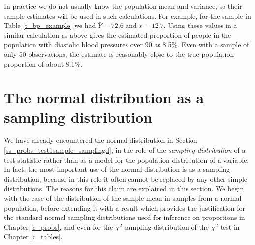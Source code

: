 In practice we do not usually know the population mean and variance, so
their sample estimates will be used in such calculations. For example,
for the sample in Table \ref{t_bp_example} we had $\bar{Y}=72.6$ and
$s=12.7$. Using these values in a similar calculation as above gives the
estimated proportion of people in the population with diastolic blood
pressures over 90 as 8.5\%. Even with a sample of only 50 observations,
the estimate is reasonably close to the true population proportion of
about 8.1\%.

\section{The normal distribution as a sampling distribution}
\label{s_contd_clt}

We have already encountered the normal distribution in Section
\ref{ss_probs_test1sample_samplingd}, in the role of the \emph{sampling
distribution} of a test statistic rather than as a model for the population
distribution of a variable. In fact, the most important use of the
normal distribution is as a sampling distribution, because in this role
it often cannot be replaced by any other simple distributions. The
reasons for this claim are explained in this section. We begin with the
case of the distribution of the sample mean in samples from a
normal population, before extending it with a result
which provides the justification for the
standard normal sampling distributions used for inference on proportions
in Chapter \ref{c_probs}, and even for the $\chi^{2}$ sampling distribution
of the $\chi^{2}$ test in Chapter \ref{c_tables}.

